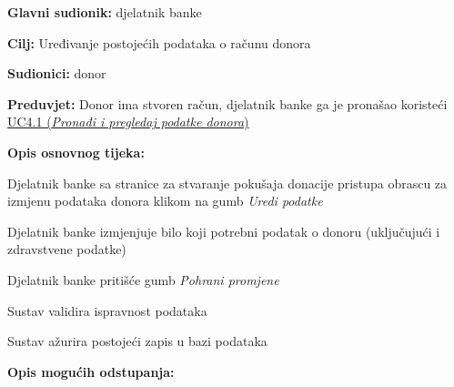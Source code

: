 					\noindent {}
					\begin{packed_item} \label{UC5.1}
	
						\item \textbf{Glavni sudionik: }djelatnik banke
						\item  \textbf{Cilj:} Uređivanje postojećih podataka o računu donora
						\item  \textbf{Sudionici:} donor
						\item  \textbf{Preduvjet:} Donor ima stvoren račun, djelatnik banke ga je pronašao koristeći \hyperref[UC4.1]{UC4.1 (\textit{Pronađi i pregledaj podatke donora})} 
						\item  \textbf{Opis osnovnog tijeka:}
						
						\item[] \begin{packed_enum}
	                        \item Djelatnik banke sa stranice za stvaranje pokušaja donacije pristupa obrascu za izmjenu podataka donora klikom na gumb \textit{Uredi podatke}
	                        \item Djelatnik banke izmjenjuje bilo koji potrebni podatak o donoru  (uključujući i zdravstvene podatke)
	                        \item Djelatnik banke pritišće gumb \textit{Pohrani promjene}
	                        \item Sustav validira ispravnost podataka
	                        \item Sustav ažurira postojeći zapis u bazi podataka
						\end{packed_enum}
						
						\item  \textbf{Opis mogućih odstupanja:}
						
						\item[] \begin{packed_item}
	

\end{packed_item}
\end{packed_item}
